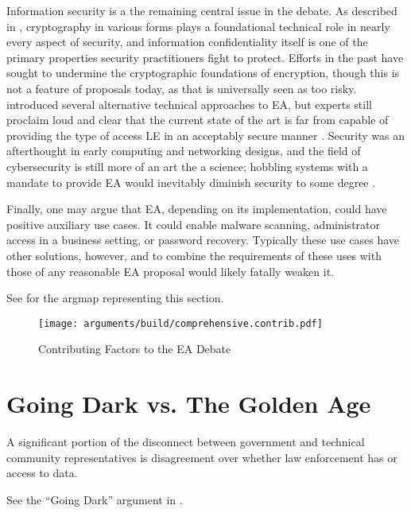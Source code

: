 Information security is a the remaining central issue in the debate. As described in ,
\ac{cryptography} in various forms plays a foundational technical role in nearly every aspect of security, and
information confidentiality itself is one of the primary properties security practitioners fight to protect. Efforts in
the past have sought to undermine the cryptographic foundations of encryption, though this is not a feature of proposals
today, as that is universally seen as too risky.  introduced several alternative technical
approaches to \ac{EA}, but experts still proclaim loud and clear that the current state of the art is far from capable
of providing the type of access \acl{LE} in an acceptably secure manner \cite{abelson_2015} \cite{abelson_risks_1997}.
Security was an afterthought in early computing and networking designs, and the field of cybersecurity is still more of
an art the a science; hobbling systems with a mandate to provide \ac{EA} would inevitably diminish security to some
degree \cite{abelson_2015}.

Finally, one may argue that \ac{EA}, depending on its implementation, could have positive auxiliary use cases. It could
enable malware scanning, administrator access in a business setting, or password recovery. Typically these use cases
have other solutions, however, and to combine the requirements of these uses with those of any reasonable \ac{EA}
proposal would likely fatally weaken it.

See  for the \ac{argmap} representing this section.

\begin{sidewaysfigure}
  \centering\CaptionFontSize
  \texttt{[image: arguments/build/comprehensive.contrib.pdf]}
  \caption[Contributing Factors to the EA Debate]{Contributing Factors to the EA Debate}
  \label{fig-args-contrib}
\end{sidewaysfigure}

\section{Going Dark vs. The Golden Age}

A significant portion of the disconnect between government and technical community representatives is disagreement over
whether law enforcement has  or  access to data.

See the ``Going Dark'' argument in .


